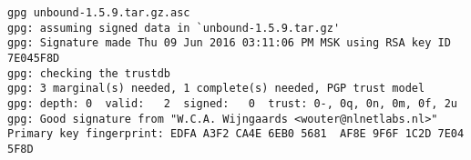 \documentclass[a4paper]{article}
\begin{document}
\begin{appendices}
\begin{verbatim}
gpg unbound-1.5.9.tar.gz.asc 
gpg: assuming signed data in `unbound-1.5.9.tar.gz'
gpg: Signature made Thu 09 Jun 2016 03:11:06 PM MSK using RSA key ID 7E045F8D
gpg: checking the trustdb
gpg: 3 marginal(s) needed, 1 complete(s) needed, PGP trust model
gpg: depth: 0  valid:   2  signed:   0  trust: 0-, 0q, 0n, 0m, 0f, 2u
gpg: Good signature from "W.C.A. Wijngaards <wouter@nlnetlabs.nl>"
Primary key fingerprint: EDFA A3F2 CA4E 6EB0 5681  AF8E 9F6F 1C2D 7E04 5F8D

\end{verbatim}
\end{appendices}


\enddocument
\end{document}
